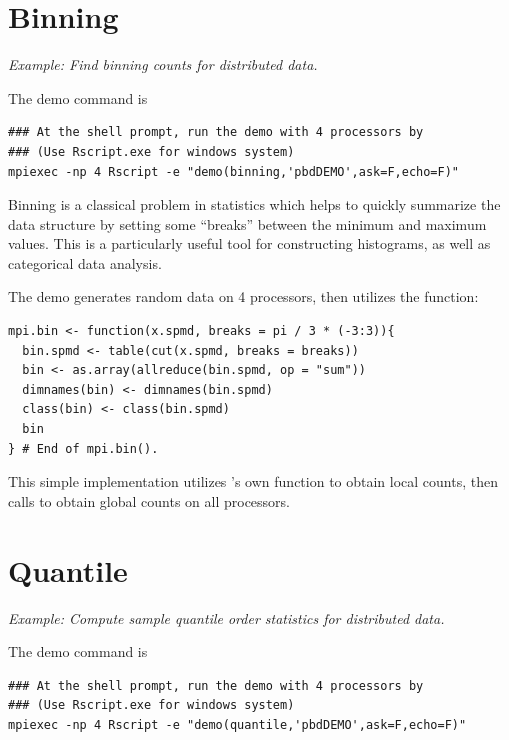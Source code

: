 \section[Binning]{Binning}%
\label{sec:binning}

\emph{Example:  Find binning counts for distributed data.}

The demo command is
\begin{lstlisting}
### At the shell prompt, run the demo with 4 processors by
### (Use Rscript.exe for windows system)
mpiexec -np 4 Rscript -e "demo(binning,'pbdDEMO',ask=F,echo=F)"
\end{lstlisting}

Binning is a classical problem in statistics which helps to quickly summarize
the data structure by setting some ``breaks'' between the minimum and maximum values.
This is a particularly useful tool for constructing histograms, as well as categorical data analysis.

The demo generates random data on 4 processors, then
utilizes the  function:
\begin{lstlisting}[language=rr,title=R Code]
mpi.bin <- function(x.spmd, breaks = pi / 3 * (-3:3)){
  bin.spmd <- table(cut(x.spmd, breaks = breaks))
  bin <- as.array(allreduce(bin.spmd, op = "sum"))
  dimnames(bin) <- dimnames(bin.spmd)
  class(bin) <- class(bin.spmd)
  bin
} # End of mpi.bin().
\end{lstlisting}
This simple implementation utilizes 's own  function to obtain
local counts, then calls  to obtain global counts on all processors.






\section[Quantile]{Quantile}%
\label{sec:quantile}

\emph{Example:  Compute sample quantile order statistics for distributed data.}

The demo command is
\begin{lstlisting}
### At the shell prompt, run the demo with 4 processors by
### (Use Rscript.exe for windows system)
mpiexec -np 4 Rscript -e "demo(quantile,'pbdDEMO',ask=F,echo=F)"
\end{lstlisting}


